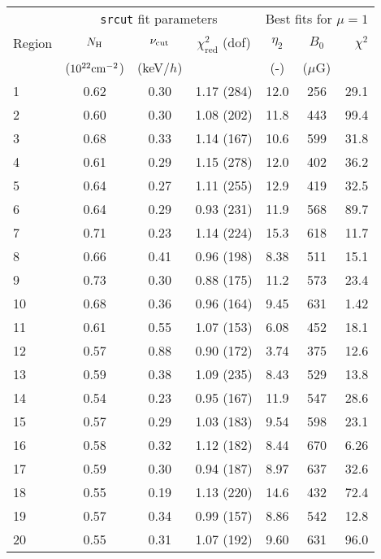 \begin{tabular}{@{}l ccc ccr@{}}
    \toprule
    {} & \multicolumn{3}{c}{\texttt{srcut} fit parameters}
    & \multicolumn{3}{c}{Best fits for $\mu = 1$}\\
    \cmidrule(lr){2-4} \cmidrule(l){5-7}
    Region & $N_{\mathrm{H}}$ & $\nu_{\mathrm{cut}}$ & $\chi^2_{\mathrm{red}}$ (dof)
           & $\eta_2$ & $B_0$ & $\chi^2$ \\
    {} & ($10^{22} \mathrm{cm}^{-2}$) & (keV/$h$) & {}
       & (-) & ($\mu$G) & {} \\
    \midrule
    1 & 0.62 & 0.30 & 1.17 (284) & 12.0 & 256 & 29.1 \\
    2 & 0.60 & 0.30 & 1.08 (202) & 11.8 & 443 & 99.4 \\
    3 & 0.68 & 0.33 & 1.14 (167) & 10.6 & 599 & 31.8 \\
    \cmidrule{1-7}
    4 & 0.61 & 0.29 & 1.15 (278) & 12.0 & 402 & 36.2 \\
    5 & 0.64 & 0.27 & 1.11 (255) & 12.9 & 419 & 32.5 \\
    6 & 0.64 & 0.29 & 0.93 (231) & 11.9 & 568 & 89.7 \\
    7 & 0.71 & 0.23 & 1.14 (224) & 15.3 & 618 & 11.7 \\
    8 & 0.66 & 0.41 & 0.96 (198) & 8.38 & 511 & 15.1 \\
    9 & 0.73 & 0.30 & 0.88 (175) & 11.2 & 573 & 23.4 \\
    10 & 0.68 & 0.36 & 0.96 (164) & 9.45 & 631 & 1.42 \\
    \cmidrule{1-7}
    11 & 0.61 & 0.55 & 1.07 (153) & 6.08 & 452 & 18.1 \\
    12 & 0.57 & 0.88 & 0.90 (172) & 3.74 & 375 & 12.6 \\
    13 & 0.59 & 0.38 & 1.09 (235) & 8.43 & 529 & 13.8 \\
    \cmidrule{1-7}
    14 & 0.54 & 0.23 & 0.95 (167) & 11.9 & 547 & 28.6 \\
    15 & 0.57 & 0.29 & 1.03 (183) & 9.54 & 598 & 23.1 \\
    16 & 0.58 & 0.32 & 1.12 (182) & 8.44 & 670 & 6.26 \\
    17 & 0.59 & 0.30 & 0.94 (187) & 8.97 & 637 & 32.6 \\
    \cmidrule{1-7}
    18 & 0.55 & 0.19 & 1.13 (220) & 14.6 & 432 & 72.4 \\
    19 & 0.57 & 0.34 & 0.99 (157) & 8.86 & 542 & 12.8 \\
    20 & 0.55 & 0.31 & 1.07 (192) & 9.60 & 631 & 96.0 \\
    \bottomrule
\end{tabular}
